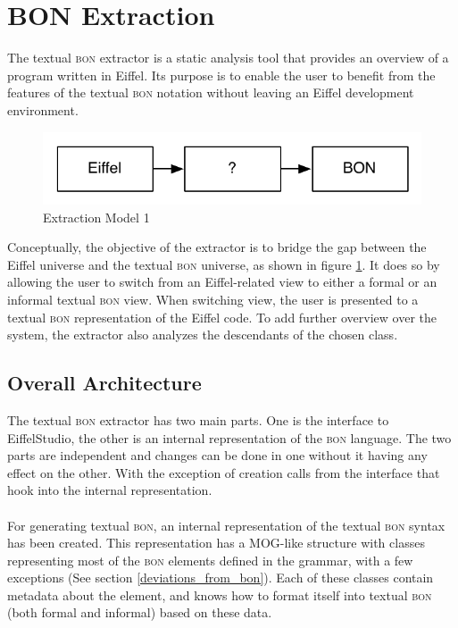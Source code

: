\section{BON Extraction}
The textual \textsc{bon} extractor is a static analysis tool that provides an overview of a program written in Eiffel. Its purpose is to enable the user to benefit from the features of the textual \textsc{bon} notation without leaving an Eiffel development environment. 

\begin{figure}[H]
\centering
\includegraphics[scale=0.8]{images/BON-extraction-model-1.pdf}
\caption{\bon{} Extraction Model 1}
\label{fig:bon_extraction_1}
\end{figure}
\label{design-bon-extraction}
Conceptually, the objective of the extractor is to bridge the gap between the Eiffel universe and the textual \textsc{bon} universe, as shown in figure \ref{fig:bon_extraction_1}. It does so by allowing the user to switch from an Eiffel-related view to either a formal or an informal textual \textsc{bon} view. When switching view, the user is presented to a textual \textsc{bon} representation of the Eiffel code. To add further overview over the system, the extractor also analyzes the descendants of the chosen class.

\subsection{Overall Architecture}
The textual \textsc{bon} extractor has two main parts. One is the interface to EiffelStudio, the other is an internal representation of the \textsc{bon} language. The two parts are independent and changes can be done in one without it having any effect on the other. With the exception of creation calls from the interface that hook into the internal representation.

\paragraph{}
For generating textual \textsc{bon},  an internal representation of the textual \textsc{bon} syntax has been created. This representation has a MOG-like structure with classes representing most of the \textsc{bon} elements defined in the grammar, with a few exceptions (See section \ref{deviations_from_bon}).  Each of these classes contain metadata about the element, and knows how to format itself into textual \textsc{bon} (both formal and informal) based on these data.

